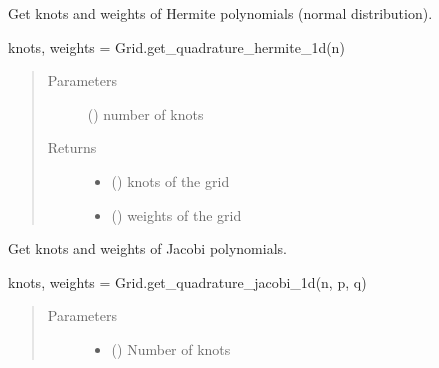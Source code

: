 \documentclass[letterpaper,10pt,english,openany,oneside]{sphinxmanual}
\begin{document}
\begin{fulllineitems}
\begin{fulllineitems}
\label{\detokenize{pygpc:pygpc.Grid.Grid.get_quadrature_hermite_1d}}
Get knots and weights of Hermite polynomials (normal distribution).

knots, weights = Grid.get\_quadrature\_hermite\_1d(n)
\begin{quote}\begin{description}
\item[{Parameters}] \leavevmode
{} () \textendash{} number of knots

\item[{Returns}] \leavevmode
\begin{itemize}
\item {} 
 () \textendash{} knots of the grid

\item {} 
 () \textendash{} weights of the grid

\end{itemize}


\end{description}\end{quote}

\end{fulllineitems}


\begin{fulllineitems}
\label{\detokenize{pygpc:pygpc.Grid.Grid.get_quadrature_jacobi_1d}}
Get knots and weights of Jacobi polynomials.

knots, weights = Grid.get\_quadrature\_jacobi\_1d(n, p, q)
\begin{quote}\begin{description}
\item[{Parameters}] \leavevmode\begin{itemize}
\item {} 
 () \textendash{} Number of knots


\end{itemize}
\end{description}
\end{quote}
\end{fulllineitems}
\end{fulllineitems}
\end{document}
